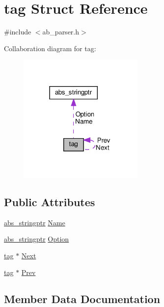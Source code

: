 \hypertarget{structtag}{}\section{tag Struct Reference}
\label{structtag}


{\ttfamily \#include $<$ab\+\_\+parser.\+h$>$}



Collaboration diagram for tag\+:\nopagebreak
\begin{figure}[H]
\begin{center}
\leavevmode
\includegraphics[width=174pt]{db/d25/structtag__coll__graph}
\end{center}
\end{figure}
\subsection*{Public Attributes}
\begin{DoxyCompactItemize}
\item 
\hyperlink{structabs__stringptr}{abs\+\_\+stringptr} \hyperlink{structtag_a4564f437775d5276bcddbc23a6b8881e}{Name}
\item 
\hyperlink{structabs__stringptr}{abs\+\_\+stringptr} \hyperlink{structtag_aa52b4f28c97f8ff006a5fe50d6623a7e}{Option}
\item 
\hyperlink{structtag}{tag} $\ast$ \hyperlink{structtag_ae16f0e5fb461cdbae551134f3e1e8e24}{Next}
\item 
\hyperlink{structtag}{tag} $\ast$ \hyperlink{structtag_af05983b55100a16b3bcd8faad9b50e00}{Prev}
\end{DoxyCompactItemize}


\subsection{Member Data Documentation}
\mbox{\label{structtag_a4564f437775d5276bcddbc23a6b8881e}} 
